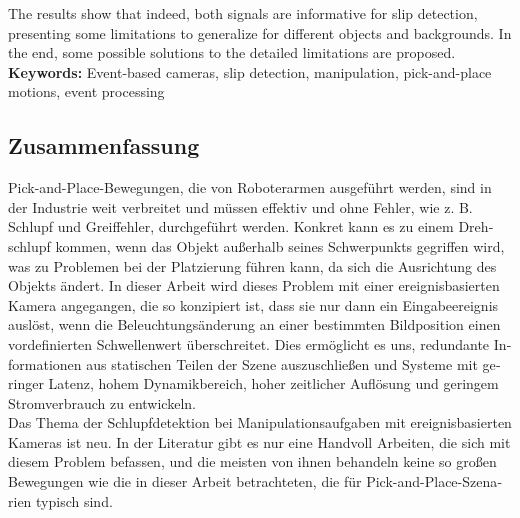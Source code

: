 The results show that indeed, both signals are informative for slip detection, presenting some limitations to generalize for different objects and backgrounds. In the end, some possible solutions to the detailed limitations are proposed.\\

\textbf{Keywords:} Event-based cameras, slip detection, manipulation, pick-and-place motions, event processing

\cleardoublepage
\begin{otherlanguage}{ngerman}
\chapter*{Zusammenfassung}%

Pick-and-Place-Bewegungen, die von Roboterarmen ausgeführt werden, sind in der Industrie weit verbreitet und müssen effektiv und ohne Fehler, wie z. B. Schlupf und Greiffehler, durchgeführt werden. Konkret kann es zu einem Drehschlupf kommen, wenn das Objekt außerhalb seines Schwerpunkts gegriffen wird, was zu Problemen bei der Platzierung führen kann, da sich die Ausrichtung des Objekts ändert. In dieser Arbeit wird dieses Problem mit einer ereignisbasierten Kamera angegangen, die so konzipiert ist, dass sie nur dann ein Eingabeereignis auslöst, wenn die Beleuchtungsänderung an einer bestimmten Bildposition einen vordefinierten Schwellenwert überschreitet. Dies ermöglicht es uns, redundante Informationen aus statischen Teilen der Szene auszuschließen und Systeme mit geringer Latenz, hohem Dynamikbereich, hoher zeitlicher Auflösung und geringem Stromverbrauch zu entwickeln.\\

Das Thema der Schlupfdetektion bei Manipulationsaufgaben mit ereignisbasierten Kameras ist neu. In der Literatur gibt es nur eine Handvoll Arbeiten, die sich mit diesem Problem befassen, und die meisten von ihnen behandeln keine so großen Bewegungen wie die in dieser Arbeit betrachteten, die für Pick-and-Place-Szenarien typisch sind.\\


\end{otherlanguage}
